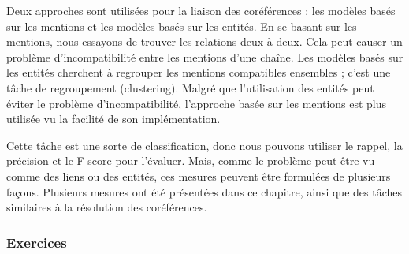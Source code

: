 \documentclass{KodeBook}
\begin{document}
Deux approches sont utilisées pour la liaison des coréférences : les modèles basés sur les mentions et les modèles basés sur les entités. 
En se basant sur les mentions, nous essayons de trouver les relations deux à deux.
Cela peut causer un problème d'incompatibilité entre les mentions d'une chaîne. 
Les modèles basés sur les entités cherchent à regrouper les mentions compatibles ensembles ; c'est une tâche de regroupement (clustering). 
Malgré que l'utilisation des entités peut éviter le problème d'incompatibilité, l'approche basée sur les mentions est plus utilisée vu la facilité de son implémentation. 

Cette tâche est une sorte de classification, donc nous pouvons utiliser le rappel, la précision et le F-score pour l'évaluer. 
Mais, comme le problème peut être vu comme des liens ou des entités, ces mesures peuvent être formulées de plusieurs façons. 
Plusieurs mesures ont été présentées dans ce chapitre, ainsi que des tâches similaires à la  résolution des coréférences.


\subsubsection*{Exercices}
\end{document}
